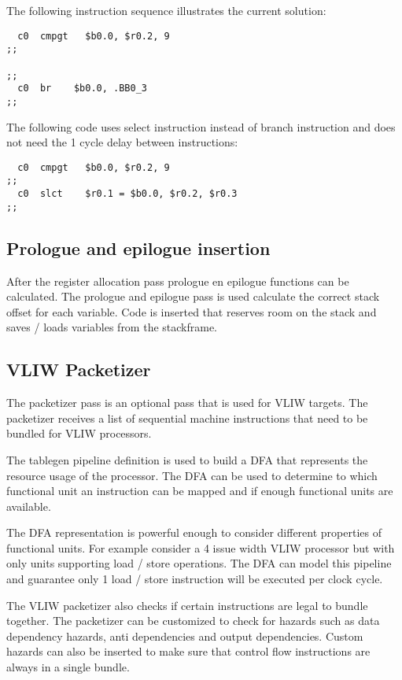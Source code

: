 The following instruction sequence illustrates the current solution: 

\begin{lstlisting}
  c0  cmpgt   $b0.0, $r0.2, 9
;;

;;
  c0  br    $b0.0, .BB0_3
;;
\end{lstlisting}

The following code uses select instruction instead of branch instruction and does not need the 1 cycle delay between instructions:

\begin{lstlisting}
  c0  cmpgt   $b0.0, $r0.2, 9
;;
  c0  slct    $r0.1 = $b0.0, $r0.2, $r0.3 
;;
\end{lstlisting}

\subsection{Prologue and epilogue insertion}
After the register allocation pass prologue en epilogue functions can be calculated. The prologue and epilogue pass is used calculate the correct stack offset for each variable. Code is inserted that reserves room on the stack and saves / loads variables from the stackframe.

\subsection{VLIW Packetizer}
The packetizer pass is an optional pass that is used for VLIW targets. The packetizer receives a list of sequential machine instructions that need to be bundled for VLIW processors. 

The tablegen pipeline definition is used to build a DFA that represents the resource usage of the processor. The DFA can be used to determine to which functional unit an instruction can be mapped and if enough functional units are available.

The DFA representation is powerful enough to consider different properties of functional units. For example consider a 4 issue width VLIW processor but with only units supporting load / store operations. The DFA can model this pipeline and guarantee only 1 load / store instruction will be executed per clock cycle.

The VLIW packetizer also checks if certain instructions are legal to bundle together. The packetizer can be customized to check for hazards such as data dependency hazards, anti dependencies and output dependencies. Custom hazards can also be inserted to make sure that control flow instructions are always in a single bundle.


